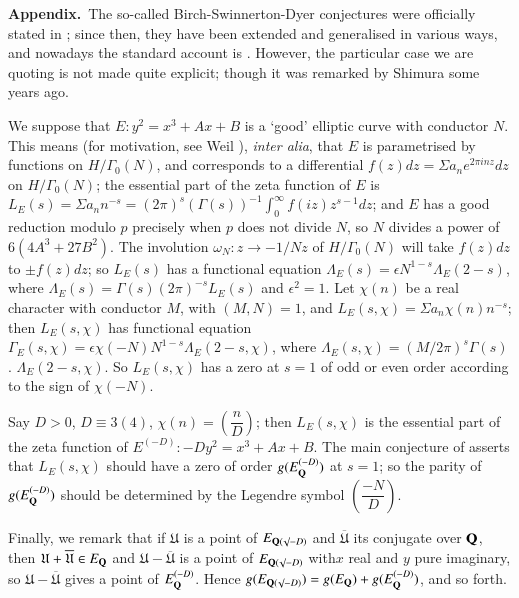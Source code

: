 \medskip
\noindent
{\bf Appendix.}~The so-called Birch-Swinnerton-Dyer conjectures were officially stated in \cite{art03-key2}; since then, they have been extended and generalised in various ways, and nowadays the standard account is \cite{art03-key8}. However, the particular case we are quoting is not made quite explicit; though it was remarked by Shimura some years ago.

We suppose that $E:y^{2}=x^{3}+Ax+B$ is a `good' elliptic curve with conductor $N$. This means (for motivation, see Weil \cite{art03-key10}), {\em inter alia}, that $E$ is parametrised by functions on $H/\Gamma_{0}(N)$, and corresponds to a differential $f(z)dz=\Sigma a_{n}e^{2\pi inz}dz$ on $H/\Gamma_{0}(N)$; the essential part of the zeta function of $E$ is $L_{E}(s)=\Sigma a_{n}n^{-s}=(2\pi)^{s}(\Gamma(s))^{-1}\int^{\infty}_{0}f(iz)z^{s-1}dz$; and $E$ has a good reduction modulo $p$ precisely when $p$ does not divide $N$, so $N$ divides a power of $6(4 A^{3}+27B^{2})$. The involution $\omega_{N}:z\to -1/Nz$ of $H/\Gamma_{0}(N)$ will take $f(z)dz$ to $\pm f(z)dz$; so $L_{E}(s)$ has a functional equation $\Lambda_{E}(s)=\epsilon N^{1-s}\Lambda_{E}(2-s)$, where $\Lambda_{E}(s)=\Gamma(s)(2\pi)^{-s}L_{E}(s)$ and $\epsilon^{2}=1$. Let $\chi(n)$ be a real character with conductor $M$, with $(M,N)=1$, and $L_{E}(s,\chi)=\Sigma a_{n}\chi(n)n^{-s}$; then $L_{E}(s,\chi)$ has functional equation $\Gamma_{E}(s,\chi)=\epsilon \chi(-N)N^{1-s}\Lambda_{E}(2-s,\chi)$, where $\Lambda_{E}(s,\chi)=(M/2\pi)^{s}\Gamma(s)$. $\Lambda_{E}(2-s,\chi)$. So $L_{E}(s,\chi)$ has a zero at $s=1$ of odd or even order according to the sign of $\chi(-N)$.

Say $D>0$, $D\equiv 3(4)$, $\chi(n)=\left(\dfrac{n}{D}\right)$; then $L_{E}(s,\chi)$ is the essential part of the zeta function of $E^{(-D)}:-Dy^{2}=x^{3}+Ax+B$. The main conjecture of \cite{art03-key2} asserts that $L_{E}(s,\chi)$ should have a zero of order $g(E^{(-D)}_{\mathbf{Q}})$ at $s=1$; so the parity of $g(E^{(-D)}_{\mathbf{Q}})$ should be determined by the Legendre symbol $\left(\dfrac{-N}{D}\right)$.

Finally, we remark that if $\mathfrak{U}$ is a point of $E_{\mathbf{Q}(\surd-D)}$ and $\overline{\mathfrak{U}}$ its conjugate over $\mathbf{Q}$, then $\mathfrak{U}+\overline{\mathfrak{U}}\in E_{\mathbf{Q}}$ and $\mathfrak{U}-\overline{\mathfrak{U}}$ is a point of $E_{\mathbf{Q}(\surd-D)}$ with\pageoriginale $x$ real and $y$ pure imaginary, so $\mathfrak{U}-\overline{\mathfrak{U}}$ gives a point of $E_{\mathbf{Q}}^{(-D)}$. Hence $g(E_{\mathbf{Q}(\surd-D)})=g(E_{\mathbf{Q}})+g(E_{\mathbf{Q}}^{(-D)})$, and so forth.

